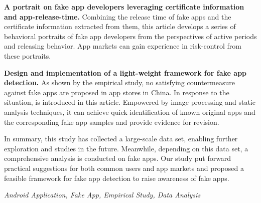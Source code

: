 \textbf{A portrait on fake app developers leveraging certificate information and app-release-time. }
Combining the release time of fake apps and the certificate information extracted from them, this article develops a series of behavioral portraits of fake app developers from the perspectives of active periods and releasing behavior.
App markets can gain experience in risk-control from these portraits.

\textbf{Design and implementation of a light-weight framework for fake app detection. }
As shown by the empirical study, no satisfying countermeasure against fake apps are proposed in app stores in China.
In response to the situation, \mytool is introduced in this article.
Empowered by image processing and static analysis techniques, it can achieve quick identification of known original apps and the corresponding fake app samples and provide evidence for revision.

In summary, this study has collected a large-scale data set, enabling further exploration and studies in the future.
Meanwhile, depending on this data set, a comprehensive analysis is conducted on fake apps.
Our study put forward practical suggestions for both common users and app markets and proposed a feasible framework for fake app detection to raise awareness of fake apps.

{} \textit{Android Application, Fake App, Empirical Study, Data Analysis}
